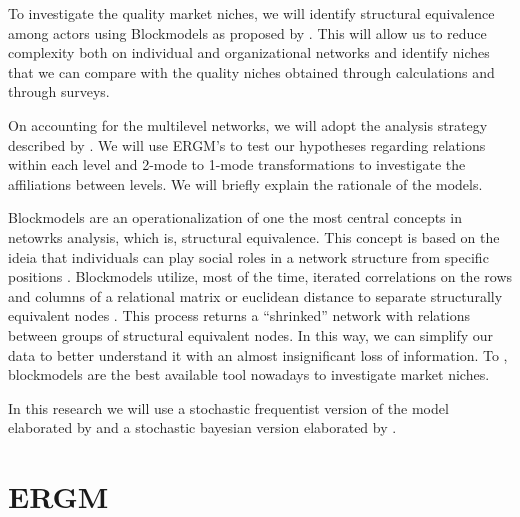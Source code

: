 \documentclass[a4paper, 12pt, openright, oneside, german, french, brazil, english]{abntex2}
\begin{document}
        To investigate the quality market niches, we will identify structural equivalence among actors using Blockmodels as proposed by . This will allow us to reduce complexity both on individual and organizational networks and identify niches that we can compare with the quality niches obtained through calculations and through surveys.

        On accounting for the multilevel networks, we will adopt the analysis strategy described by . We will use ERGM's to test our hypotheses regarding relations within each level and 2-mode to 1-mode transformations to investigate the affiliations between levels. We will briefly explain the rationale of the models.

        Blockmodels are an operationalization of one the most central concepts in netowrks analysis, which is, structural equivalence. This concept is based on the ideia that individuals can play social roles in a network structure from specific positions \cite{lazega2014redes}. Blockmodels utilize, most of the time, iterated correlations on the rows and columns of a relational matrix or euclidean distance to separate structurally equivalent nodes \cite{wasserman1994social}. This process returns a ``shrinked'' network with relations between groups of structural equivalent nodes. In this way, we can simplify our data to better understand it with an almost insignificant loss of information. To , blockmodels are the best available tool nowadays to investigate market niches.
	
	
	In this research we will use a stochastic frequentist version of the model elaborated by  and a stochastic bayesian version elaborated by .
	
	
	\section{ERGM}
	
	
\end{document}
